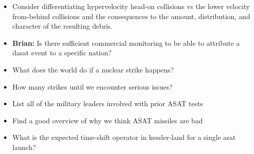 
\begin{itemize}

\item Consider differentiating hypervelocity head-on collisions vs the
  lower velocity from-behind collisions and the consequences to the
  amount, distribution, and character of the resulting debris.

\item {\bf Brian:} Is there sufficient commercial monitoring to be
  able to attribute a dasat event to a specific nation?

\item What does the world do if a nuclear strike happens?

\item How many strikes until we encounter serious issues?

\item List all of the military leaders involved with prior ASAT tests

\item Find a good overview of why we think ASAT missiles are bad

\item What is the expected time-shift operator in kessler-land for a
  single asat launch?
  
\end{itemize}



